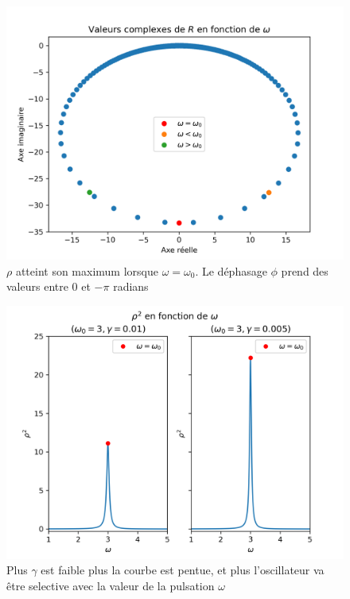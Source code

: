 \documentclass{article}
\begin{document}
\begin{figure}[h]
    \centering
    \includegraphics[scale=0.6]{figs/R_valeurs.png}
    \caption{$\rho$ atteint son maximum lorsque $\omega = \omega_0$. Le déphasage $\phi$ prend des valeurs entre $0$ et $-
    \pi$ radians}
\end{figure}

\begin{figure}[h]
    \centering
    \includegraphics[scale=0.7]{figs/rho_plot_contrast.png}
    \caption{Plus $\gamma$ est faible plus la courbe est pentue, et plus l'oscillateur va être selective avec la valeur de la pulsation $\omega$}
    \centering
\end{figure}
\end{document}
